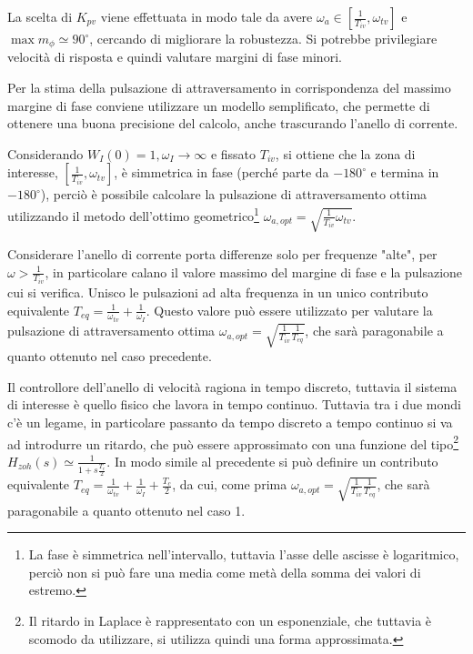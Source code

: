 La scelta di \(K_{pv}\) viene effettuata in modo tale da avere \(\omega_a \in \left[\frac{1}{T_{iv}}, \omega_{tv}\right]\) e \(\max{m_\phi} \simeq 90^\circ\), cercando di migliorare la robustezza. Si potrebbe privilegiare velocità di risposta e quindi valutare margini di fase minori.

Per la stima della pulsazione di attraversamento in corrispondenza del massimo margine di fase conviene utilizzare un modello semplificato, che permette di ottenere una buona precisione del calcolo, anche trascurando l'anello di corrente.

Considerando \(W_I(0)=1, \omega_I\rightarrow \infty\) e fissato \(T_{iv}\), si ottiene che la zona di interesse, \(\left[\frac{1}{T_{iv}}, \omega_{tv}\right]\), è simmetrica in fase (perché parte da \(-180^\circ\) e termina in \(-180^\circ\)),  perciò è possibile calcolare la pulsazione di attraversamento ottima utilizzando il metodo dell'ottimo geometrico\footnote{La fase è simmetrica nell'intervallo, tuttavia l'asse delle ascisse è logaritmico, perciò non si può fare una media come metà della somma dei valori di estremo.} \(\omega_{a,opt} = \sqrt{\frac{1}{T_{iv}}\omega_{tv}}\).

Considerare l'anello di corrente porta differenze solo per frequenze "alte", per \(\omega>\frac{1}{T_{iv}}\), in particolare calano il valore massimo del margine di fase e la pulsazione cui si verifica. Unisco le pulsazioni ad alta frequenza in un unico contributo equivalente \(T_{eq}=\frac{1}{\omega_{tv}}+\frac{1}{\omega_I}\). Questo valore può essere utilizzato per valutare la pulsazione di attraversamento ottima \(\omega_{a,opt} = \sqrt{\frac{1}{T_{iv}}\frac{1}{T_{eq}}}\), che sarà paragonabile a quanto ottenuto nel caso precedente.

Il controllore dell'anello di velocità ragiona in tempo discreto, tuttavia il sistema di interesse è quello fisico che lavora in tempo continuo. Tuttavia tra i due mondi c'è un legame, in particolare passanto da tempo discreto a tempo continuo si va ad introdurre un ritardo, che può essere approssimato con una funzione del tipo\footnote{Il ritardo in Laplace è rappresentato con un esponenziale, che tuttavia è scomodo da utilizzare, si utilizza quindi una forma approssimata.} \(H_{zoh}(s) \simeq \frac{1}{1+s\frac{T_c}{2}}\). In modo simile al precedente si può definire un contributo equivalente \(T_{eq}=\frac{1}{\omega_{tv}}+\frac{1}{\omega_I}+\frac{T_c}{2}\), da cui, come prima \(\omega_{a,opt} = \sqrt{\frac{1}{T_{iv}}\frac{1}{T_{eq}}}\), che sarà paragonabile a quanto ottenuto nel caso 1.

